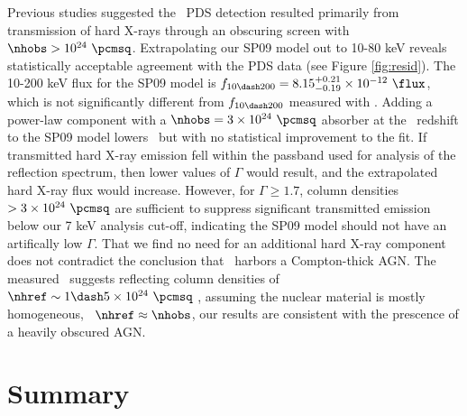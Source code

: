 \documentclass[useAMS,usenatbib]{mn2e}
\begin{document}
Previous studies suggested the \bepposax\ PDS detection resulted
primarily from transmission of hard X-rays through an obscuring screen
with $\nhobs > 10^{24} ~\pcmsq$. Extrapolating our SP09 model out to
10-80 keV reveals statistically acceptable agreement with the PDS data
(see Figure \ref{fig:resid}). The 10-200 keV flux for the SP09 model
is $f_{10 \dash 200} = 8.15^{+0.21}_{-0.19} \times 10^{-12} ~\flux$,
which is not significantly different from $f_{10 \dash 200}$ measured
with \bepposax. Adding a power-law component with a $\nhobs = 3 \times
10^{24} ~\pcmsq$ absorber at the \irs\ redshift to the SP09 model
lowers \chisq\ but with no statistical improvement to the fit. If
transmitted hard X-ray emission fell within the passband used for
analysis of the reflection spectrum, then lower values of $\Gamma$
would result, and the extrapolated hard X-ray flux would
increase. However, for $\Gamma \ge 1.7$, column densities $> 3 \times
10^{24} ~\pcmsq$ are sufficient to suppress significant transmitted
emission below our 7 keV analysis cut-off, indicating the SP09 model
should not have an artifically low $\Gamma$. That we find no need for
an additional hard X-ray component does not contradict the conclusion
that \irs\ harbors a Compton-thick AGN. The measured \fekaew\ suggests
reflecting column densities of $\nhref \sim 1 \dash 5 \times 10^{24}
~\pcmsq$ \citep{1993MNRAS.263..314L, 2005A&A...444..119G}, assuming
the nuclear material is mostly homogeneous, \ie\ $\nhref \approx
\nhobs$, our results are consistent with the prescence of a heavily
obscured AGN.

\section{Summary}
\label{sec:summ}
\end{document}
